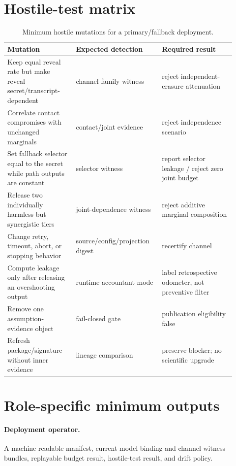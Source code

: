 \documentclass[11pt]{article}
\begin{document}
\section{Hostile-test matrix}\label{sec:hostile}
\begin{table}[t]
\centering
\small
\begin{tabular}{@{}p{0.29\linewidth}p{0.33\linewidth}p{0.30\linewidth}@{}}
\toprule
Mutation & Expected detection & Required result\\
\midrule
Keep equal reveal rate but make reveal secret/transcript-dependent & channel-family witness & reject independent-erasure attenuation\\
Correlate contact compromises with unchanged marginals & contact/joint evidence & reject independence scenario\\
Set fallback selector equal to the secret while path outputs are constant & selector witness & report selector leakage / reject zero joint budget\\
Release two individually harmless but synergistic tiers & joint-dependence witness & reject additive marginal composition\\
Change retry, timeout, abort, or stopping behavior & source/config/projection digest & recertify channel\\
Compute leakage only after releasing an overshooting output & runtime-accountant mode & label retrospective odometer, not preventive filter\\
Remove one assumption-evidence object & fail-closed gate & publication eligibility false\\
Refresh package/signature without inner evidence & lineage comparison & preserve blocker; no scientific upgrade\\
\bottomrule
\end{tabular}
\caption{Minimum hostile mutations for a primary/fallback deployment.}
\label{tab:hostile}
\end{table}

\section{Role-specific minimum outputs}\label{sec:roles}
\paragraph{Deployment operator.}
A machine-readable manifest, current model-binding and channel-witness bundles, replayable budget result, hostile-test result, and drift policy.
\end{document}
